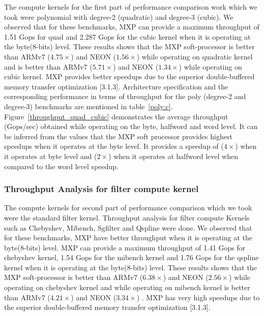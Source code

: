The compute kernels for the first part of performance comparison work which we took were polynomial with degree-2 (quadratic) and degree-3 (cubic).
We observed that for these benchmarks, MXP can provide a maximum throughput of 1.51 Gops for quad and 2.287 Gops for the cubic kernel when it is operating at the byte(8-bits) level. These results shows that the MXP soft-processor is better than ARMv7 ($4.75\times$) and NEON ($1.56\times$) while operating on quadratic kernel and is better than ARMv7 ($5.71\times$) and NEON ($1.34\times$) while operating on cubic kernel. MXP provides better speedups due to the superior double-buffered memory transfer optimization [3.1.3]. Architecture specification and the corresponding performance in terms of throughput for the poly (degree-2 and degree-3) benchmarks are mentioned in table~\ref{poly:c}.  Figure~\ref{throughput_quad_cubic} demonstrates the average throughput (Gops/sec) obtained while operating on the byte, halfword and word level. It can be inferred from the values that the MXP soft processor provides highest speedups when it operates at the byte level. It provides a speedup of ($4\times$) when it operates at byte level and ($2\times$) when it operates at halfword level when compared to the word level speedup.


%
%
%



\subsubsection{Throughput Analysis for filter compute kernel}

The compute kernels for second part of performance comparison which we took were the standard filter kernel. Throughput analysis for filter compute Kernels such as Chebyshev, Mibench, Sgfilter and Qspline were done.
We observed that for these benchmarks, MXP have better throughput when it is operating at the byte(8-bits) level. MXP can provide a maximum throughput of 1.41 Gops for chebyshev kernel, 1.54 Gops for the mibench kernel and 1.76 Gops for the qspline kernel when it is operating at the byte(8-bits) level. These results shows that the MXP soft-processor is better than ARMv7 ($6.38\times$) and NEON ($2.56\times$) while operating on chebyshev kernel and while operating on mibench kernel is better than ARMv7 ($4.21\times$) and NEON ($3.34\times$) . MXP has very high speedups due to the superior double-buffered memory transfer optimization [3.1.3]. 

